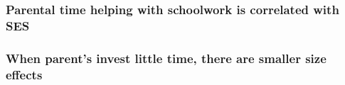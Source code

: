 \documentclass{beamer}
\begin{document}
\begin{frame}
    \label{frame:parental_investments_vs_ses}
    \frametitle{Parental time helping with schoolwork is correlated with SES}
        {
    }

\end{frame}


\begin{frame}
    \label{frame:byses}
    \frametitle{When parent's invest little time, there are smaller size effects}
        {
    }

    \begin{flushleft}
        \hyperlink{frame:byses_siblings}{}
    \end{flushleft}    

\end{frame}
\end{document}
